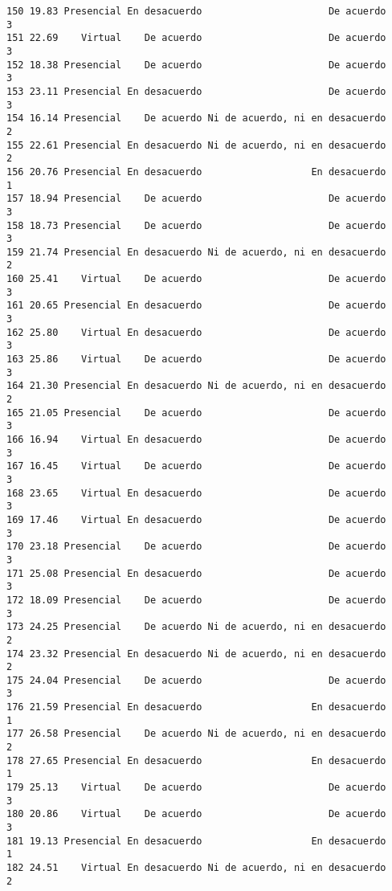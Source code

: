 \documentclass[
  letterpaper,
  DIV=11,
  numbers=noendperiod]{scrartcl}
\begin{document}
\begin{verbatim}
150 19.83 Presencial En desacuerdo                      De acuerdo           3
151 22.69    Virtual    De acuerdo                      De acuerdo           3
152 18.38 Presencial    De acuerdo                      De acuerdo           3
153 23.11 Presencial En desacuerdo                      De acuerdo           3
154 16.14 Presencial    De acuerdo Ni de acuerdo, ni en desacuerdo           2
155 22.61 Presencial En desacuerdo Ni de acuerdo, ni en desacuerdo           2
156 20.76 Presencial En desacuerdo                   En desacuerdo           1
157 18.94 Presencial    De acuerdo                      De acuerdo           3
158 18.73 Presencial    De acuerdo                      De acuerdo           3
159 21.74 Presencial En desacuerdo Ni de acuerdo, ni en desacuerdo           2
160 25.41    Virtual    De acuerdo                      De acuerdo           3
161 20.65 Presencial En desacuerdo                      De acuerdo           3
162 25.80    Virtual En desacuerdo                      De acuerdo           3
163 25.86    Virtual    De acuerdo                      De acuerdo           3
164 21.30 Presencial En desacuerdo Ni de acuerdo, ni en desacuerdo           2
165 21.05 Presencial    De acuerdo                      De acuerdo           3
166 16.94    Virtual En desacuerdo                      De acuerdo           3
167 16.45    Virtual    De acuerdo                      De acuerdo           3
168 23.65    Virtual En desacuerdo                      De acuerdo           3
169 17.46    Virtual En desacuerdo                      De acuerdo           3
170 23.18 Presencial    De acuerdo                      De acuerdo           3
171 25.08 Presencial En desacuerdo                      De acuerdo           3
172 18.09 Presencial    De acuerdo                      De acuerdo           3
173 24.25 Presencial    De acuerdo Ni de acuerdo, ni en desacuerdo           2
174 23.32 Presencial En desacuerdo Ni de acuerdo, ni en desacuerdo           2
175 24.04 Presencial    De acuerdo                      De acuerdo           3
176 21.59 Presencial En desacuerdo                   En desacuerdo           1
177 26.58 Presencial    De acuerdo Ni de acuerdo, ni en desacuerdo           2
178 27.65 Presencial En desacuerdo                   En desacuerdo           1
179 25.13    Virtual    De acuerdo                      De acuerdo           3
180 20.86    Virtual    De acuerdo                      De acuerdo           3
181 19.13 Presencial En desacuerdo                   En desacuerdo           1
182 24.51    Virtual En desacuerdo Ni de acuerdo, ni en desacuerdo           2

\end{verbatim}
\end{document}
